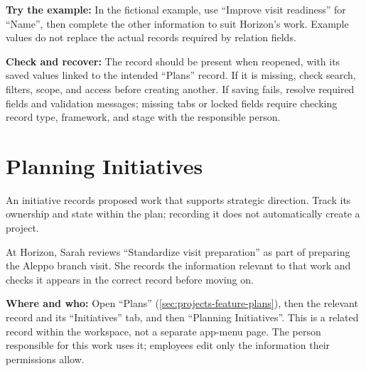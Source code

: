 \textbf{Try the example:} In the fictional example, use “Improve visit readiness” for “Name”, then complete the other information to suit Horizon's work. Example values do not replace the actual records required by relation fields.

\textbf{Check and recover:} The record should be present when reopened, with its saved values linked to the intended “Plans” record. If it is missing, check search, filters, scope, and access before creating another. If saving fails, resolve required fields and validation messages; missing tabs or locked fields require checking record type, framework, and stage with the responsible person.

\clearpage
\section{Planning Initiatives}
\label{sec:projects-feature-planning-initiatives}

An initiative records proposed work that supports strategic direction. Track its ownership and state within the plan; recording it does not automatically create a project.

\begin{rcnote}
At Horizon, Sarah reviews “Standardize visit preparation” as part of preparing the Aleppo branch visit. She records the information relevant to that work and checks it appears in the correct record before moving on.
\end{rcnote}

\textbf{Where and who:} Open “Plans” (\ref{sec:projects-feature-plans}), then the relevant record and its “Initiatives” tab, and then “Planning Initiatives”. This is a related record within the workspace, not a separate app-menu page. The person responsible for this work uses it; employees edit only the information their permissions allow.

